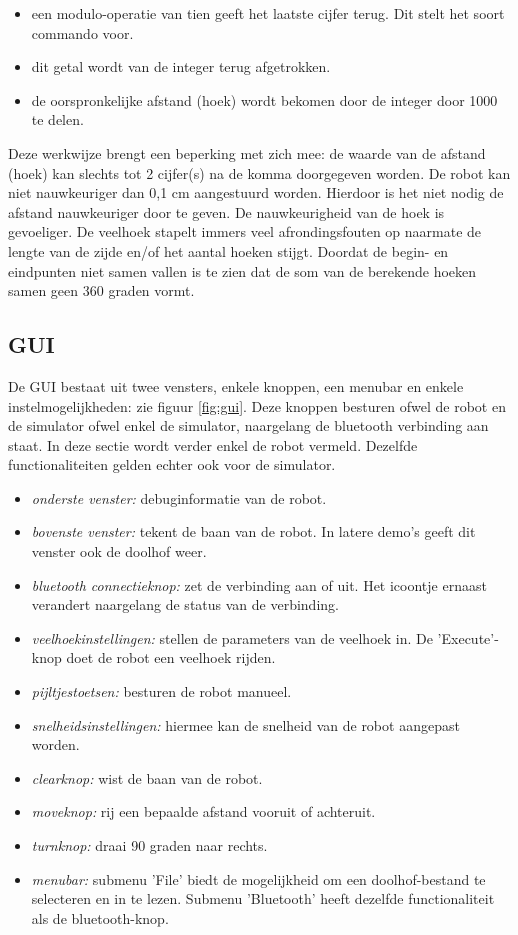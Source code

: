 \documentclass[tt3]{penoverslag}
\begin{document}
\begin{itemize}
\item een modulo-operatie van tien geeft het laatste cijfer terug. Dit stelt het soort commando voor.
\item dit getal wordt van de integer terug afgetrokken.
\item de oorspronkelijke afstand (hoek) wordt bekomen door de integer door 1000 te delen.
\end{itemize}

Deze werkwijze brengt een beperking met zich mee: de waarde van de afstand (hoek) kan slechts tot 2 cijfer(s) na de komma doorgegeven worden. De robot kan niet nauwkeuriger dan 0,1 cm aangestuurd worden. Hierdoor is het niet nodig de afstand nauwkeuriger door te geven. De nauwkeurigheid van de hoek is gevoeliger. De veelhoek stapelt immers veel afrondingsfouten op naarmate de lengte van de zijde en/of het aantal hoeken stijgt. Doordat de begin- en eindpunten niet samen vallen is te zien dat de som van de berekende hoeken samen geen 360 graden vormt. 

\subsection{GUI} %
\label{ssec:GUI}
De GUI bestaat uit twee vensters, enkele knoppen, een menubar en enkele instelmogelijkheden: zie figuur \ref{fig:gui}. Deze knoppen besturen ofwel de robot en de simulator ofwel enkel de simulator, naargelang de bluetooth verbinding aan staat. In deze sectie wordt verder enkel de robot vermeld. Dezelfde functionaliteiten gelden echter ook voor de simulator.

\begin{itemize}
\item \textit{onderste venster:} debuginformatie van de robot.
\item \textit{bovenste venster:} tekent de baan van de robot. In latere demo's geeft dit venster ook de doolhof weer.
\item \textit{bluetooth connectieknop:} zet de verbinding aan of uit. Het icoontje ernaast verandert naargelang de status van de verbinding.
\item \textit{veelhoekinstellingen:} stellen de parameters van de veelhoek in. De 'Execute'-knop doet de robot een veelhoek rijden.
\item \textit{pijltjestoetsen:} besturen de robot manueel.
\item \textit{snelheidsinstellingen:} hiermee kan de snelheid van de robot aangepast worden.
\item \textit{clearknop:} wist de baan van de robot.
\item \textit{moveknop:} rij een bepaalde afstand vooruit of achteruit.
\item \textit{turnknop:} draai 90 graden naar rechts.
\item \textit{menubar:} submenu 'File' biedt de mogelijkheid om een doolhof-bestand te selecteren en in te lezen. Submenu 'Bluetooth' heeft dezelfde functionaliteit als de bluetooth-knop.
\end{itemize}
\end{document}
